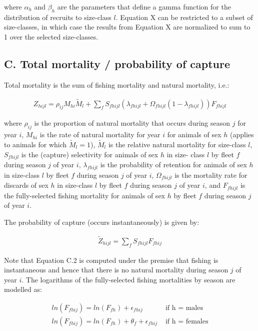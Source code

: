 \documentclass[]{article}
\begin{document}
where \(\alpha_{h}\) and \(\beta_{h}\) are the parameters that define a
gamma function for the distribution of recruits to size-class \(l\).
Equation X can be restricted to a subset of size-classes, in which case
the results from Equation X are normalized to sum to 1 over the selected
size-classes.

\subsection{C. Total mortality / probability of
capture}\label{c.-total-mortality-probability-of-capture}

Total mortality is the sum of fishing mortality and natural mortality,
i.e.:

\begin{align}
 Z_{hijl} = \rho_{ij}M_{hi}\tilde{M}_{l} + \sum_{f} S_{fhijl}(\lambda_{fhijl} + \Omega_{fhijl}(1-\lambda_{fhijl}))F_{fhijl}
\end{align}

where \(\rho_{ij}\) is the proportion of natural mortality that occurs
during season \(j\) for year \(i\), \(M_{hi}\) is the rate of natural
mortality for year \(i\) for animals of sex \(h\) (applies to animals
for which \(\tilde{M}_{l} = 1\)), \(\tilde{M}_{l}\) is the relative
natural mortality for size-class \(l\), \(S_{fhijl}\) is the (capture)
selectivity for animals of sex \(h\) in size- class \(l\) by fleet \(f\)
during season \(j\) of year \(i\), \(\lambda_{fhijl}\) is the
probability of retention for animals of sex \(h\) in size-class \(l\) by
fleet \(f\) during season \(j\) of year \(i\), \(\Omega_{fhijl}\) is the
mortality rate for discards of sex \(h\) in size-class \(l\) by fleet
\(f\) during season \(j\) of year \(i\), and \(F_{fhijl}\) is the
fully-selected fishing mortality for animals of sex \(h\) by fleet \(f\)
during season \(j\) of year \(i\).

The probability of capture (occurs instantaneously) is given by:

\begin{align}
 \widetilde{Z}_{hijl} = \sum_{f} S_{fhijl}F_{fhij}
\end{align}

Note that Equation C.2 is computed under the premise that fishing is
instantaneous and hence that there is no natural mortality during season
\(j\) of year \(i\). The logarithms of the fully-selected fishing
mortalities by season are modelled as:

\begin{align}
 ln(F_{fhij}) = ln(F_{fh}) + \epsilon_{fhij}  & \text{  if h = males} \\[2ex]
 ln(F_{fhij}) = ln(F_{fh}) + \theta_{f} + \epsilon_{fhij}  & \text{  if h = females} 
\end{align}
\end{document}
